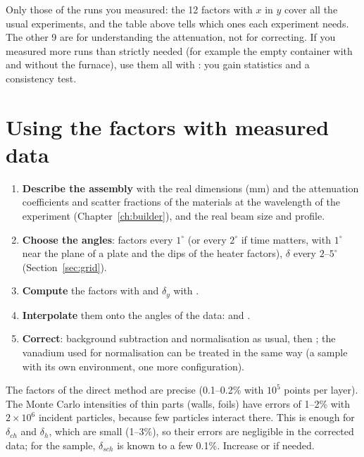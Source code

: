 \begin{note}
Only those of the runs you measured: the 12 factors with $x$ in $y$ cover all the usual experiments, and the table above tells which
ones each experiment needs. The other 9 are for understanding the attenuation, not for correcting. If you measured more runs than
strictly needed (for example the empty container with and without the furnace), use them all with : you gain
statistics and a consistency test.
\end{note}

\section{Using the factors with measured data}

\begin{enumerate}
  \item \textbf{Describe the assembly} with the real dimensions (mm) and the attenuation coefficients and scatter fractions of the
        materials at the wavelength of the experiment (Chapter~\ref{ch:builder}), and the real beam size and profile.
  \item \textbf{Choose the angles}: factors every $1^\circ$ (or every $2^\circ$ if time matters, with $1^\circ$ near the plane of a plate
        and the dips of the heater factors), $\delta$ every $2$--$5^\circ$ (Section~\ref{sec:grid}).
  \item \textbf{Compute} the factors with  and $\delta_y$ with .
  \item \textbf{Interpolate} them onto the angles of the data:  and
        .
  \item \textbf{Correct}: background subtraction and normalisation as usual, then ; the vanadium used for
        normalisation can be treated in the same way (a sample with its own environment, one more configuration).
\end{enumerate}

\begin{warn}[Statistics]
The factors of the direct method are precise (0.1--0.2\% with $10^5$ points per layer). The Monte Carlo intensities of thin parts
(walls, foils) have errors of 1--2\% with $2\times10^6$ incident particles, because few particles interact there. This is enough for
$\delta_{ch}$ and $\delta_h$, which are small (1--3\%), so their errors are negligible in the corrected data; for the sample,
$\delta_{sch}$ is known to a few 0.1\%. Increase  or  if needed.
\end{warn}
